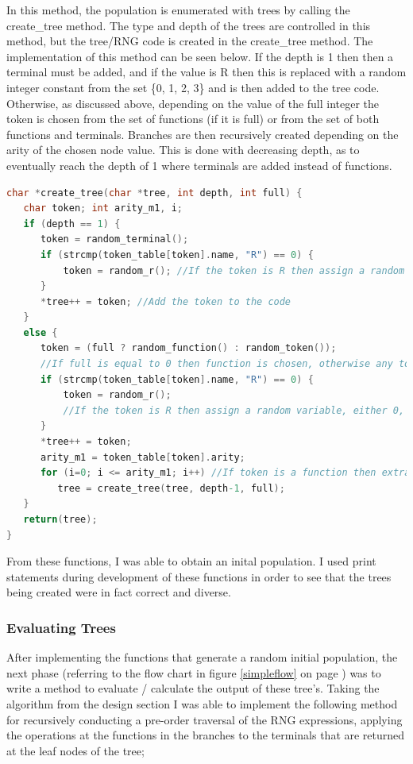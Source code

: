 \documentclass[a4paper,10.5pt]{article}
\begin{document}
In this method, the population is enumerated with trees by calling the create\_tree method. The type and depth of the trees are controlled in this method, but the tree/RNG code is created in the create\_tree method. The implementation of this method can be seen below. If the depth is 1 then then a terminal must be added, and if the value is R then this is replaced with a random integer constant from the set \{0, 1, 2, 3\} and is then added to the tree code. Otherwise, as discussed above, depending on the value of the full integer the token is chosen from the set of functions (if it is full) or from the set of both functions and terminals. Branches are then recursively created depending on the arity of the chosen node value. This is done with decreasing depth, as to eventually reach the depth of 1 where terminals are added instead of functions.

\begin{lstlisting}[language=C]
char *create_tree(char *tree, int depth, int full) { 
   char token; int arity_m1, i;
   if (depth == 1) {
      token = random_terminal();
	  if (strcmp(token_table[token].name, "R") == 0) {
		  token = random_r(); //If the token is R then assign a random variable, either 0, 1, 2 or 3
	  }
	  *tree++ = token; //Add the token to the code
   }
   else { 
	  token = (full ? random_function() : random_token()); 
	  //If full is equal to 0 then function is chosen, otherwise any token from F and T can be chosen
	  if (strcmp(token_table[token].name, "R") == 0) {
		  token = random_r(); 
 		  //If the token is R then assign a random variable, either 0, 1, 2 or 3
	  }
	  *tree++ = token;
      arity_m1 = token_table[token].arity;
      for (i=0; i <= arity_m1; i++) //If token is a function then extra branches are created
         tree = create_tree(tree, depth-1, full);
   }
   return(tree);
}
\end{lstlisting}

From these functions, I was able to obtain an inital population. I used print statements during development of these functions in order to see that the trees being created were in fact correct and diverse.
\subsubsection{Evaluating Trees}
After implementing the functions that generate a random initial population, the next phase (referring to the flow chart in figure \ref{simpleflow} on page \pageref{simpleflow}) was to write a method to evaluate / calculate the output of these tree's. Taking the algorithm from the design section I was able to implement the following method for recursively conducting a pre-order traversal of the RNG expressions, applying the operations at the functions in the branches to the terminals that are returned at the leaf nodes of the tree;
\end{document}
